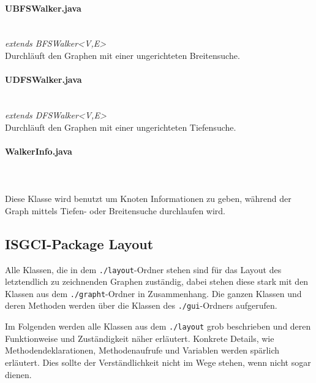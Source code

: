\documentclass[10pt,a4paper]{article}
\begin{document}
\paragraph{UBFSWalker.java}\ \\
\emph{ extends BFSWalker<V,E>}\\
Durchläuft den Graphen mit einer ungerichteten Breitensuche.\\
\paragraph{UDFSWalker.java}\ \\
\emph{extends DFSWalker<V,E>}\\
Durchläuft den Graphen mit einer ungerichteten Tiefensuche.\\
\paragraph{WalkerInfo.java}\ \\
\emph{}\\
Diese Klasse wird benutzt um Knoten Informationen zu geben, während der Graph mittels Tiefen- oder Breitensuche durchlaufen wird.

\subsection{ISGCI-Package Layout}

Alle Klassen, die in dem \texttt{./layout}-Ordner stehen sind für das Layout des letztendlich zu zeichnenden Graphen zuständig, dabei stehen diese stark mit den Klassen aus dem \texttt{./grapht}-Ordner in Zusammenhang. Die ganzen Klassen und deren Methoden werden über die Klassen des \texttt{./gui}-Ordners aufgerufen.

Im Folgenden werden alle Klassen aus dem \texttt{./layout} grob beschrieben und deren Funktionweise und Zuständigkeit näher erläutert. Konkrete Details, wie Methodendeklarationen, Methodenaufrufe und Variablen werden spärlich erläutert. Dies sollte der Verständlichkeit nicht im Wege stehen, wenn nicht sogar dienen.
\end{document}
